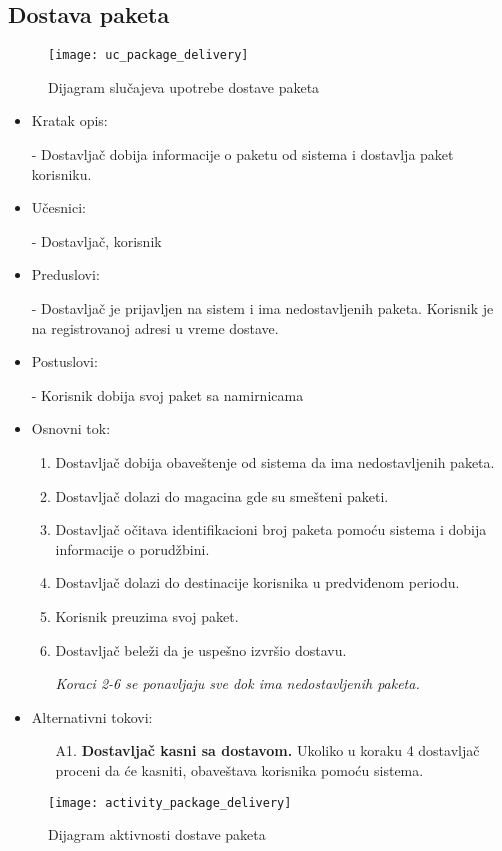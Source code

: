 
\subsection{Dostava paketa}
\begin{figure}[h]
	\begin{center}
		\texttt{[image: uc\_package\_delivery]}
	\end{center}
	\caption{Dijagram slučajeva upotrebe dostave paketa}
\end{figure}

	\begin{itemize}
		\item{Kratak opis:} 
		
		- Dostavljač dobija informacije o paketu od sistema i dostavlja paket korisniku.
		\item{Učesnici:} 
		
		- Dostavljač, korisnik
		\item{Preduslovi:}
		
		- Dostavljač je prijavljen na sistem i ima nedostavljenih paketa. Korisnik je na registrovanoj adresi u vreme dostave.
		\item{Postuslovi:}
		
		- Korisnik dobija svoj paket sa namirnicama
		\item{Osnovni tok:}
		\begin{enumerate}
			\item{Dostavljač dobija obaveštenje od sistema da ima nedostavljenih paketa.}
			\item{Dostavljač dolazi do magacina gde su smešteni paketi.}
			\item{Dostavljač očitava identifikacioni broj paketa pomoću sistema i dobija informacije o porudžbini.}
			\item{Dostavljač dolazi do destinacije korisnika u predviđenom periodu.}
			\item{Korisnik preuzima svoj paket.}
			\item{Dostavljač beleži da je uspešno izvršio dostavu.}

			\textit{Koraci 2-6 se ponavljaju sve dok ima nedostavljenih paketa.}
		\end{enumerate}
		
		\item{Alternativni tokovi:}
			\begin{enumerate}
				\item[A1.] \textbf{Dostavljač kasni sa dostavom.} Ukoliko u koraku 4 				dostavljač proceni da će kasniti, obaveštava korisnika pomoću sistema.
			\end{enumerate}
	\end{itemize}
	
\begin{figure}[h]
	\begin{center}
		\texttt{[image: activity\_package\_delivery]}
	\end{center}
	\caption{Dijagram aktivnosti dostave paketa}
\end{figure}	
